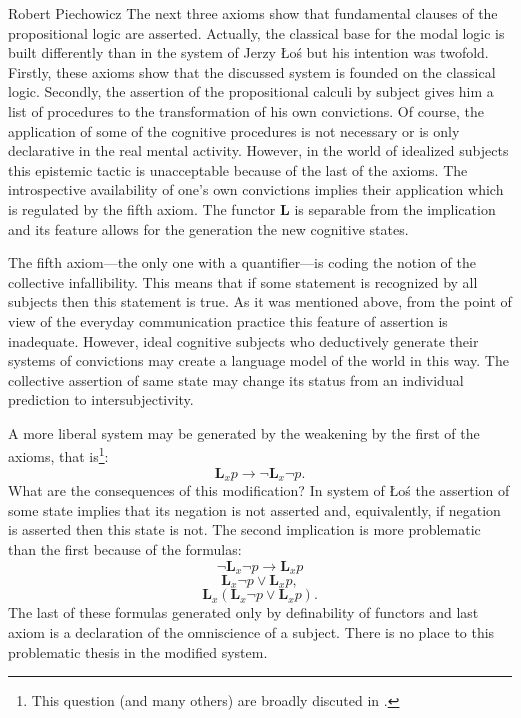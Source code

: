\begin{artengenv}{Robert Piechowicz}
The next three axioms show that fundamental clauses of the propositional logic are asserted. Actually, the classical base for the modal logic is built differently than in the system of Jerzy \L{}o\'{s} but his intention was twofold. Firstly, these axioms show that the discussed system is founded on the classical logic. Secondly, the assertion of the propositional calculi by subject gives him a list of procedures to the transformation of his own convictions. Of course, the application of some of the cognitive procedures is not necessary or is only declarative in the real mental activity. However, in the world of idealized subjects this epistemic tactic is unacceptable because of the last of the axioms. The introspective availability of one's own convictions implies their application which is regulated by the fifth axiom. The functor $\mathbf{L}$ is separable from the implication and its feature allows for the generation the new cognitive states.

The fifth axiom---the only one with a quantifier---is coding the notion of the collective infallibility. This means that if some statement is recognized by all subjects then this statement is true. As it was mentioned above, from the point of view of the everyday communication practice this feature of assertion is inadequate.  However, ideal cognitive subjects who deductively generate their systems of convictions may create a language model of the world in this way. The collective assertion of same state may change its status from an individual prediction to intersubjectivity.

A more liberal system may be generated by the weakening by the first of the axioms, that is\footnote{This question (and many others) are broadly discuted in
\parencites[][p.254-264]{lechniak_przekonania_2011}[][p.75-88]{marciszewski_podstawy_1972}.}:
$$\mathbf{L}_{x}p\rightarrow \neg \mathbf{L}_{x}\neg p.$$
What are the consequences of this modification? In system of \L{}o\'{s} the assertion of some state implies that its negation is not asserted and, equivalently, if negation is asserted then this state is not. The second implication is more problematic than the first because of the formulas:
$$\neg \mathbf{L}_{x}\neg p\rightarrow  \mathbf{L}_{x} p$$
$$\mathbf{L}_{x}\neg p\vee \mathbf{L}_{x}p,$$
$$\mathbf{L}_{x}(\mathbf{L}_{x}\neg p\vee \mathbf{L}_{x}p).$$
The last of these formulas generated only by definability of functors and last axiom is a declaration of the omniscience of a subject. There is no place to this problematic thesis in the modified system.


\end{artengenv}
